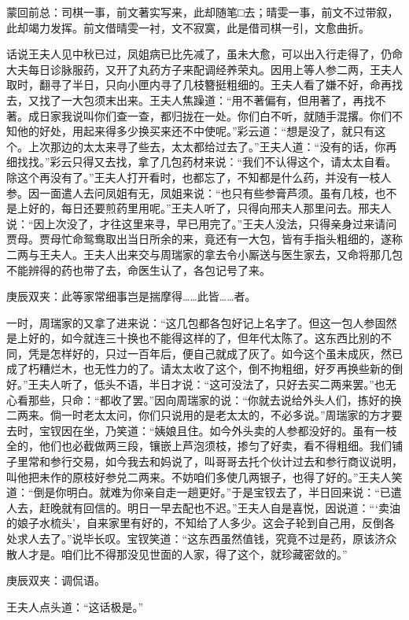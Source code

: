 \begin{parag}
    \begin{note}蒙回前总：司棋一事，前文著实写来，此却随笔□去；晴雯一事，前文不过带叙，此却竭力发挥。前文借晴雯一衬，文不寂寞，此是借司棋一引，文愈曲折。\end{note}
\end{parag}


\begin{parag}
    话说王夫人见中秋已过，凤姐病已比先减了，虽未大愈，可以出入行走得了，仍命大夫每日诊脉服药，又开了丸药方子来配调经养荣丸。因用上等人参二两，王夫人取时，翻寻了半日，只向小匣内寻了几枝簪挺粗细的。王夫人看了嫌不好，命再找去，又找了一大包须末出来。王夫人焦躁道：“用不著偏有，但用著了，再找不著。成日家我说叫你们查一查，都归拢在一处。你们白不听，就随手混撂。你们不知他的好处，用起来得多少换买来还不中使呢。”彩云道：“想是没了，就只有这个。上次那边的太太来寻了些去，太太都给过去了。”王夫人道：“没有的话，你再细找找。”彩云只得又去找，拿了几包药材来说：“我们不认得这个，请太太自看。除这个再没有了。”王夫人打开看时，也都忘了，不知都是什么药，并没有一枝人参。因一面遣人去问凤姐有无，凤姐来说：“也只有些参膏芦须。虽有几枝，也不是上好的，每日还要煎药里用呢。”王夫人听了，只得向邢夫人那里问去。邢夫人说：“因上次没了，才往这里来寻，早已用完了。”王夫人没法，只得亲身过来请问贾母。贾母忙命鸳鸯取出当日所余的来，竟还有一大包，皆有手指头粗细的，遂称二两与王夫人。王夫人出来交与周瑞家的拿去令小厮送与医生家去，又命将那几包不能辨得的药也带了去，命医生认了，各包记号了来。\begin{note}庚辰双夹：此等家常细事岂是揣摩得……此皆……者。\end{note}
\end{parag}


\begin{parag}
    一时，周瑞家的又拿了进来说：“这几包都各包好记上名字了。但这一包人参固然是上好的，如今就连三十换也不能得这样的了，但年代太陈了。这东西比别的不同，凭是怎样好的，只过一百年后，便自己就成了灰了。如今这个虽未成灰，然已成了朽糟烂木，也无性力的了。请太太收了这个，倒不拘粗细，好歹再换些新的倒好。”王夫人听了，低头不语，半日才说：“这可没法了，只好去买二两来罢。”也无心看那些，只命：“都收了罢。”因向周瑞家的说：“你就去说给外头人们，拣好的换二两来。倘一时老太太问，你们只说用的是老太太的，不必多说。”周瑞家的方才要去时，宝钗因在坐，乃笑道：“姨娘且住。如今外头卖的人参都没好的。虽有一枝全的，他们也必截做两三段，镶嵌上芦泡须枝，掺匀了好卖，看不得粗细。我们铺子里常和参行交易，如今我去和妈说了，叫哥哥去托个伙计过去和参行商议说明，叫他把未作的原枝好参兑二两来。不妨咱们多使几两银子，也得了好的。”王夫人笑道：“倒是你明白。就难为你亲自走一趟更好。”于是宝钗去了，半日回来说：“已遣人去，赶晚就有回信的。明日一早去配也不迟。”王夫人自是喜悦，因说道：“‘卖油的娘子水梳头’，自来家里有好的，不知给了人多少。这会子轮到自己用，反倒各处求人去了。”说毕长叹。宝钗笑道：“这东西虽然值钱，究竟不过是药，原该济众散人才是。咱们比不得那没见世面的人家，得了这个，就珍藏密敛的。”\begin{note}庚辰双夹：调侃语。\end{note}王夫人点头道：“这话极是。”
\end{parag}


